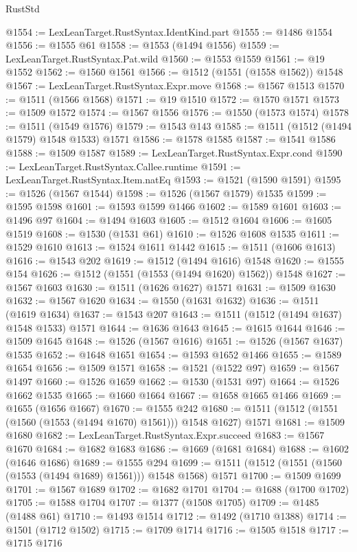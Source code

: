 \begin{lexlean}{RustStd}
\begin{coremodule}
{\begin{coremodule}
{{{{{{{{{{{{{{{{{{{{{{{{{{{{{{{{{{{@1554 := LexLeanTarget.RustSyntax.IdentKind.part
@1555 := @1486 @1554
@1556 := @1555 @61
@1558 := @1553 (@1494 @1556)
@1559 := LexLeanTarget.RustSyntax.Pat.wild
@1560 := @1553 @1559
@1561 := @19 @1552
@1562 := @1560 @1561
@1566 := @1512 (@1551 (@1558 @1562)) @1548
@1567 := LexLeanTarget.RustSyntax.Expr.move
@1568 := @1567 @1513
@1570 := @1511 (@1566 @1568)
@1571 := @19 @1510
@1572 := @1570 @1571
@1573 := @1509 @1572
@1574 := @1567 @1556
@1576 := @1550 (@1573 @1574)
@1578 := @1511 (@1549 @1576)
@1579 := @1543 @143
@1585 := @1511 (@1512 (@1494 @1579) @1548 @1533) @1571
@1586 := @1578 @1585
@1587 := @1541 @1586
@1588 := @1509 @1587
@1589 := LexLeanTarget.RustSyntax.Expr.cond
@1590 := LexLeanTarget.RustSyntax.Callee.runtime
@1591 := LexLeanTarget.RustSyntax.Item.natEq
@1593 := @1521 (@1590 @1591)
@1595 := @1526 (@1567 @1544)
@1598 := @1526 (@1567 @1579) @1535
@1599 := @1595 @1598
@1601 := @1593 @1599 @1466
@1602 := @1589 @1601
@1603 := @1496 @97
@1604 := @1494 @1603
@1605 := @1512 @1604
@1606 := @1605 @1519
@1608 := @1530 (@1531 @61)
@1610 := @1526 @1608 @1535
@1611 := @1529 @1610
@1613 := @1524 @1611 @1442
@1615 := @1511 (@1606 @1613)
@1616 := @1543 @202
@1619 := @1512 (@1494 @1616) @1548
@1620 := @1555 @154
@1626 := @1512 (@1551 (@1553 (@1494 @1620) @1562)) @1548
@1627 := @1567 @1603
@1630 := @1511 (@1626 @1627) @1571
@1631 := @1509 @1630
@1632 := @1567 @1620
@1634 := @1550 (@1631 @1632)
@1636 := @1511 (@1619 @1634)
@1637 := @1543 @207
@1643 := @1511 (@1512 (@1494 @1637) @1548 @1533) @1571
@1644 := @1636 @1643
@1645 := @1615 @1644
@1646 := @1509 @1645
@1648 := @1526 (@1567 @1616)
@1651 := @1526 (@1567 @1637) @1535
@1652 := @1648 @1651
@1654 := @1593 @1652 @1466
@1655 := @1589 @1654
@1656 := @1509 @1571
@1658 := @1521 (@1522 @97)
@1659 := @1567 @1497
@1660 := @1526 @1659
@1662 := @1530 (@1531 @97)
@1664 := @1526 @1662 @1535
@1665 := @1660 @1664
@1667 := @1658 @1665 @1466
@1669 := @1655 (@1656 @1667)
@1670 := @1555 @242
@1680 := @1511 (@1512 (@1551 (@1560 (@1553 (@1494 @1670) @1561))) @1548 @1627) @1571
@1681 := @1509 @1680
@1682 := LexLeanTarget.RustSyntax.Expr.succeed
@1683 := @1567 @1670
@1684 := @1682 @1683
@1686 := @1669 (@1681 @1684)
@1688 := @1602 (@1646 @1686)
@1689 := @1555 @294
@1699 := @1511 (@1512 (@1551 (@1560 (@1553 (@1494 @1689) @1561))) @1548 @1568) @1571
@1700 := @1509 @1699
@1701 := @1567 @1689
@1702 := @1682 @1701
@1704 := @1688 (@1700 @1702)
@1705 := @1588 @1704
@1707 := @1377 (@1508 @1705)
@1709 := @1485 (@1488 @61)
@1710 := @1493 @1514
@1712 := @1492 (@1710 @1388)
@1714 := @1501 (@1712 @1502)
@1715 := @1709 @1714
@1716 := @1505 @1518
@1717 := @1715 @1716
}}}}}}}}}}}}}}}}}}}}}}}}}}}}}}}}}}}
\end{coremodule}}
\end{coremodule}
\end{lexlean}
